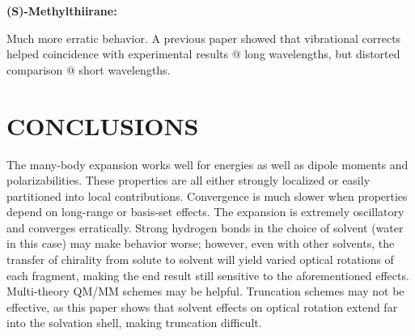 \documentclass[12pt,a4paper]{article}
\begin{document}
	\noindent\textbf{(S)-Methylthiirane:}
	
	Much more erratic behavior. A previous paper showed that vibrational corrects helped coincidence with experimental results @ long wavelengths, but distorted comparison @ short wavelengths.
	
	\section{CONCLUSIONS}
	The many-body expansion works well for energies as well as dipole moments and polarizabilities. These properties are all either strongly localized or easily partitioned into local contributions. Convergence is much slower when properties depend on long-range or basis-set effects. The expansion is extremely oscillatory and converges erratically. Strong hydrogen bonds in the choice of solvent (water in this case) may make behavior worse; however, even with other solvents, the transfer of chirality from solute to solvent will yield varied optical rotations of each fragment, making the end result still sensitive to the aforementioned effects. Multi-theory QM/MM schemes may be helpful. Truncation schemes may not be effective, as this paper shows that solvent effects on optical rotation extend far into the solvation shell, making truncation difficult.


\end{document}
